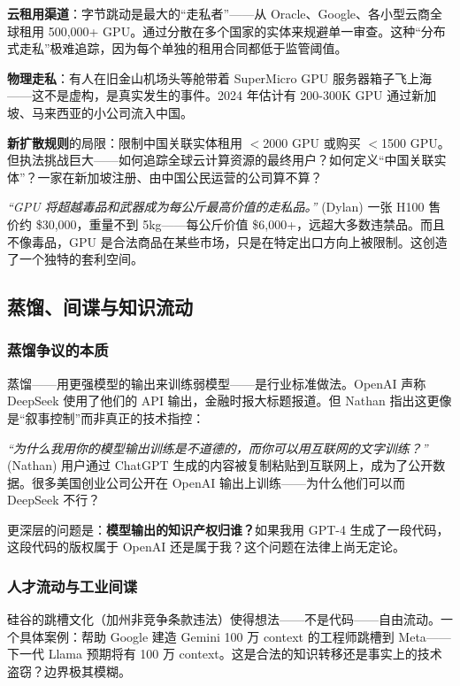 \textbf{云租用渠道}：字节跳动是最大的``走私者''——从 Oracle、Google、各小型云商全球租用 500,000+ GPU。通过分散在多个国家的实体来规避单一审查。这种``分布式走私''极难追踪，因为每个单独的租用合同都低于监管阈值。

\textbf{物理走私}：有人在旧金山机场头等舱带着 SuperMicro GPU 服务器箱子飞上海——这不是虚构，是真实发生的事件。2024 年估计有 200-300K GPU 通过新加坡、马来西亚的小公司流入中国。

\textbf{新扩散规则}的局限：限制中国关联实体租用 $<$2000 GPU 或购买 $<$1500 GPU。但执法挑战巨大——如何追踪全球云计算资源的最终用户？如何定义``中国关联实体''？一家在新加坡注册、由中国公民运营的公司算不算？

\textit{``GPU 将超越毒品和武器成为每公斤最高价值的走私品。''} (Dylan) 一张 H100 售价约 \$30,000，重量不到 5kg——每公斤价值 \$6,000+，远超大多数违禁品。而且不像毒品，GPU 是合法商品在某些市场，只是在特定出口方向上被限制。这创造了一个独特的套利空间。

\subsection{蒸馏、间谍与知识流动}

\subsubsection{蒸馏争议的本质}

蒸馏——用更强模型的输出来训练弱模型——是行业标准做法。OpenAI 声称 DeepSeek 使用了他们的 API 输出，金融时报大标题报道。但 Nathan 指出这更像是``叙事控制''而非真正的技术指控：

\textit{``为什么我用你的模型输出训练是不道德的，而你可以用互联网的文字训练？''} (Nathan) 用户通过 ChatGPT 生成的内容被复制粘贴到互联网上，成为了公开数据。很多美国创业公司公开在 OpenAI 输出上训练——为什么他们可以而 DeepSeek 不行？

更深层的问题是：\textbf{模型输出的知识产权归谁？}如果我用 GPT-4 生成了一段代码，这段代码的版权属于 OpenAI 还是属于我？这个问题在法律上尚无定论。

\subsubsection{人才流动与工业间谍}

硅谷的跳槽文化（加州非竞争条款违法）使得想法——不是代码——自由流动。一个具体案例：帮助 Google 建造 Gemini 100 万 context 的工程师跳槽到 Meta——下一代 Llama 预期将有 100 万 context。这是合法的知识转移还是事实上的技术盗窃？边界极其模糊。

